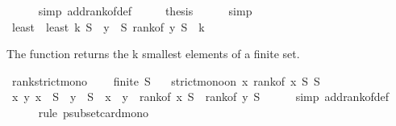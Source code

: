 \begin{isabellebody}
\ \ \ \ \isamarkupfalse%
\ {\isacharparenleft}{\kern0pt}simp\ add{\isacharcolon}{\kern0pt}rank{\isacharunderscore}{\kern0pt}of{\isacharunderscore}{\kern0pt}def{\isacharparenright}{\kern0pt}\isanewline
\ \ \isamarkupfalse%
\ \isamarkupfalse%
\ {\isacharquery}{\kern0pt}thesis\isanewline
\ \ \ \ \isamarkupfalse%
\ simp\isanewline
{}\isamarkupfalse%
%
\endisatagproof
{\isafoldproof}%
%
\isadelimproof
\isanewline
%
\endisadelimproof
\isanewline
\isanewline
{}\isamarkupfalse%
\ least\ \ {\isachardoublequoteopen}least\ k\ S\ {\isacharequal}{\kern0pt}\ {\isacharbraceleft}{\kern0pt}y\ {\isasymin}\ S{\isachardot}{\kern0pt}\ rank{\isacharunderscore}{\kern0pt}of\ y\ S\ {\isacharless}{\kern0pt}\ k{\isacharbraceright}{\kern0pt}{\isachardoublequoteclose}%
\begin{isamarkuptext}%
The function  returns the k smallest elements of a finite set.%
\end{isamarkuptext}\isamarkuptrue%
\isamarkupfalse%
\ rank{\isacharunderscore}{\kern0pt}strict{\isacharunderscore}{\kern0pt}mono{\isacharcolon}{\kern0pt}\ \isanewline
\ \ \ {\isachardoublequoteopen}finite\ S{\isachardoublequoteclose}\isanewline
\ \ \ {\isachardoublequoteopen}strict{\isacharunderscore}{\kern0pt}mono{\isacharunderscore}{\kern0pt}on\ {\isacharparenleft}{\kern0pt}{\isasymlambda}x{\isachardot}{\kern0pt}\ rank{\isacharunderscore}{\kern0pt}of\ x\ S{\isacharparenright}{\kern0pt}\ S{\isachardoublequoteclose}\isanewline
%
\isadelimproof
%
\endisadelimproof
%
\isatagproof
{}\isamarkupfalse%
\ {\isacharminus}{\kern0pt}\isanewline
\ \ \isamarkupfalse%
\ {\isachardoublequoteopen}{\isasymAnd}x\ y{\isachardot}{\kern0pt}\ x\ {\isasymin}\ S\ {\isasymLongrightarrow}\ y\ {\isasymin}\ S\ {\isasymLongrightarrow}\ x\ {\isacharless}{\kern0pt}\ y\ {\isasymLongrightarrow}\ rank{\isacharunderscore}{\kern0pt}of\ x\ S\ {\isacharless}{\kern0pt}\ rank{\isacharunderscore}{\kern0pt}of\ y\ S{\isachardoublequoteclose}\isanewline
\ \ \ \ \isamarkupfalse%
\ {\isacharparenleft}{\kern0pt}simp\ add{\isacharcolon}{\kern0pt}rank{\isacharunderscore}{\kern0pt}of{\isacharunderscore}{\kern0pt}def{\isacharparenright}{\kern0pt}\isanewline
\ \ \ \ \isamarkupfalse%
\ {\isacharparenleft}{\kern0pt}rule\ psubset{\isacharunderscore}{\kern0pt}card{\isacharunderscore}{\kern0pt}mono{\isacharparenright}{\kern0pt}\isanewline
\ \ \ \ \ \isamarkupfalse%

\end{isabellebody}
